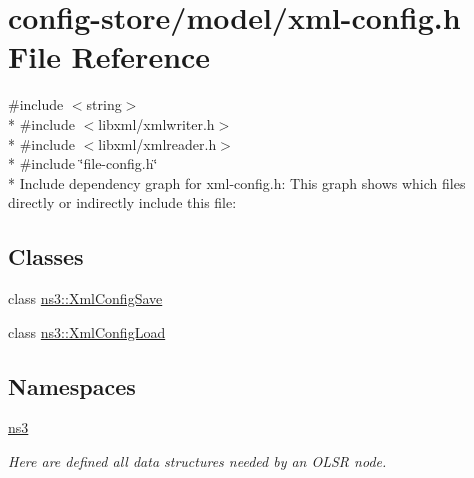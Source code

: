 \hypertarget{xml-config_8h}{}\section{config-\/store/model/xml-\/config.h File Reference}
\label{xml-config_8h}
{\ttfamily \#include $<$string$>$}\\*
{\ttfamily \#include $<$libxml/xmlwriter.\+h$>$}\\*
{\ttfamily \#include $<$libxml/xmlreader.\+h$>$}\\*
{\ttfamily \#include \char`\"{}file-\/config.\+h\char`\"{}}\\*
Include dependency graph for xml-\/config.h\+:
This graph shows which files directly or indirectly include this file\+:
\subsection*{Classes}
\begin{DoxyCompactItemize}
\item 
class \hyperlink{classns3_1_1XmlConfigSave}{ns3\+::\+Xml\+Config\+Save}
\item 
class \hyperlink{classns3_1_1XmlConfigLoad}{ns3\+::\+Xml\+Config\+Load}
\end{DoxyCompactItemize}
\subsection*{Namespaces}
\begin{DoxyCompactItemize}
\item 
 \hyperlink{namespacens3}{ns3}
\begin{DoxyCompactList}\small\item\em Here are defined all data structures needed by an O\+L\+SR node. \end{DoxyCompactList}\end{DoxyCompactItemize}
